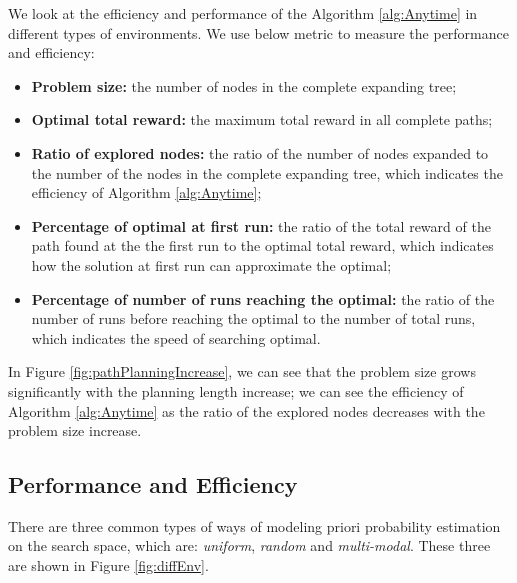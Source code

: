 We look at the efficiency and performance of the Algorithm \ref{alg:Anytime} in different types of environments. 
We use below metric to measure the performance and efficiency:
\begin{itemize}
\item \textbf{Problem size: } the number of nodes in the complete expanding tree;
\item \textbf{Optimal total reward: } the maximum total reward in all complete paths;
\item \textbf{Ratio of explored nodes: } the ratio of the number of nodes expanded to the number of the nodes in the complete expanding tree, which indicates the efficiency of Algorithm \ref{alg:Anytime};
\item \textbf{Percentage of optimal at first run: } the ratio of the total reward of the path found at the the first run to the optimal total reward, which indicates how the solution at first run can approximate the optimal;
\item \textbf{Percentage of number of runs reaching the optimal: } the ratio of the number of runs before reaching the optimal to the number of total runs, which indicates the speed of searching optimal.
\end{itemize}

In Figure \ref{fig:pathPlanningIncrease}, we can see that the problem size grows significantly with the planning length increase;
we can see the efficiency of Algorithm \ref{alg:Anytime} as the ratio of the explored nodes decreases with the problem size increase. 

\subsection{Performance and Efficiency}
\label{subsec:performance_and_efficiency}

There are three common types of ways of modeling priori probability estimation on the search space, which are: \emph{uniform}, \emph{random} and \emph{multi-modal}. 
These three are shown in Figure \ref{fig:diffEnv}.  

